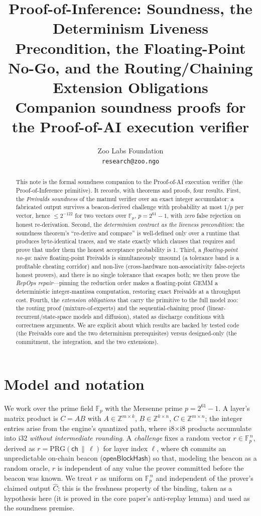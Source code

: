 \documentclass[11pt]{article}
\title{Proof-of-Inference: Soundness, the Determinism Liveness Precondition,
the Floating-Point No-Go, and the Routing/Chaining Extension Obligations\\
{\large Companion soundness proofs for the Proof-of-AI execution verifier}}
\author{Zoo Labs Foundation \\ \texttt{research@zoo.ngo}}
\date{}
\newcommand{\F}{\mathbb{F}}
\newcommand{\Z}{\mathbb{Z}}
\begin{document}
\maketitle

\begin{abstract}
This note is the formal soundness companion to the Proof-of-AI execution verifier (the
Proof-of-Inference primitive). It records, with theorems and proofs, four results. First,
the \emph{Freivalds soundness} of the matmul verifier over an exact integer accumulator: a
fabricated output survives a beacon-derived challenge with probability at most $1/p$ per
vector, hence $\le 2^{-122}$ for two vectors over $\F_p$, $p = 2^{61}-1$, with \emph{zero}
false rejection on honest re-derivation. Second, the \emph{determinism contract as the
liveness precondition}: the soundness theorem's ``re-derive and compare'' is well-defined
only over a runtime that produces byte-identical traces, and we state exactly which clauses
that requires and prove that under them the honest acceptance probability is $1$. Third, a
\emph{floating-point no-go}: naive floating-point Freivalds is simultaneously unsound (a
tolerance band is a profitable cheating corridor) and non-live (cross-hardware
non-associativity false-rejects honest provers), and there is no single tolerance that
escapes both; we then prove the \emph{RepOps repair}---pinning the reduction order makes a
floating-point GEMM a deterministic integer-mantissa computation, restoring exact Freivalds
at a throughput cost. Fourth, the \emph{extension obligations} that carry the primitive to
the full model zoo: the routing proof (mixture-of-experts) and the sequential-chaining proof
(linear-recurrent/state-space models and diffusion), stated as discharge conditions with
correctness arguments. We are explicit about which results are backed by tested code (the
Freivalds core and the two determinism prerequisites) versus designed-only (the commitment,
the integration, and the two extensions).
\end{abstract}

\tableofcontents

\section{Model and notation}

We work over the prime field $\F_p$ with the Mersenne prime $p = 2^{61}-1$. A layer's matrix
product is $C = AB$ with $A \in \Z^{m\times k}$, $B \in \Z^{k\times n}$, $C \in \Z^{m\times
n}$; the integer entries arise from the engine's quantized path, where i8$\times$i8 products
accumulate into i32 \emph{without intermediate rounding}. A \emph{challenge} fixes a random
vector $r \in \F_p^{\,n}$, derived as $r = \mathrm{PRG}(\mathsf{ch}\,\|\,\ell)$ for layer
index $\ell$, where $\mathsf{ch}$ commits an unpredictable on-chain beacon
($\mathsf{openBlockHash}$) so that, modeling the beacon as a random oracle, $r$ is
independent of any value the prover committed before the beacon was known. We treat $r$ as
uniform on $\F_p^{\,n}$ and independent of the prover's claimed output $\hat C$; this is the
freshness property of the binding, taken as a hypothesis here (it is proved in the core
paper's anti-replay lemma) and used as the soundness premise.
\end{document}
